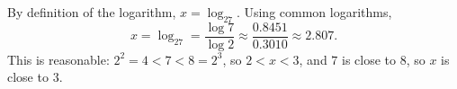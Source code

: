 By definition of the logarithm, $x=\log_27$. Using common logarithms,
\[
x=\boxed{\log_27}=\dfrac{\log7}{\log2}\approx\dfrac{0.8451}{0.3010}\approx2.807 .
\]
This is reasonable: $2^2=4<7<8=2^3$, so $2<x<3$, and $7$ is close to $8$, so $x$ is close to $3$.
